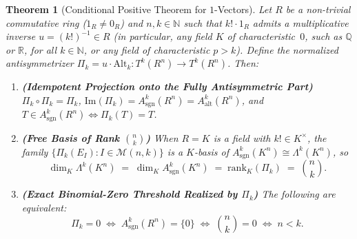 \documentclass[11pt,a4paper]{article}
\newtheorem{theorem}{Theorem}[section]
\theoremstyle{definition}
\theoremstyle{remark}
\newcommand{\Alt}{\mathrm{Alt}}
\newcommand{\sgn}{\mathrm{sgn}}
\newcommand{\im}{\mathrm{Im}}
\newcommand{\Q}{\mathbb{Q}}
\newcommand{\R}{\mathbb{R}}
\newcommand{\N}{\mathbb{N}}
\begin{document}
\begin{theorem}[Conditional Positive Theorem for $1$-Vectors]\label{thm:positive-master}
Let $R$ be a non-trivial commutative ring ($1_R \neq 0_R$) and $n, k \in \N$ such that $k! \cdot 1_R$ admits a multiplicative inverse $u = (k!)^{-1} \in R$ (in particular, any field $K$ of characteristic~$0$, such as $\Q$ or $\R$, for all $k \in \N$, or any field of characteristic $p > k$). Define the normalized antisymmetrizer $\Pi_k = u \cdot \Alt_k : T^k(R^n) \to T^k(R^n)$. Then:
\begin{enumerate}
\item[(a)] \textbf{(Idempotent Projection onto the Fully Antisymmetric Part)} $\Pi_k \circ \Pi_k = \Pi_k$, $\im(\Pi_k) = A^k_{\sgn}(R^n) = A^k_{\mathrm{alt}}(R^n)$, and $T \in A^k_{\sgn}(R^n) \iff \Pi_k(T) = T$.
\item[(b)] \textbf{(Free Basis of Rank $\binom{n}{k}$)} When $R = K$ is a field with $k! \in K^\times$, the family $\{\Pi_k(E_I) : I \in \mathcal{M}(n, k)\}$ is a $K$-basis of $A^k_{\sgn}(K^n) \cong \Lambda^k(K^n)$, so
\[
  \dim_K \Lambda^k(K^n) \;=\; \dim_K A^k_{\sgn}(K^n) \;=\; \mathrm{rank}_K(\Pi_k) \;=\; \binom{n}{k}.
\]
\item[(c)] \textbf{(Exact Binomial-Zero Threshold Realized by $\Pi_k$)} The following are equivalent:
\[
  \Pi_k = 0 \;\iff\; A^k_{\sgn}(R^n) = \{0\} \;\iff\; \binom{n}{k} = 0 \;\iff\; n < k.
\]
\end{enumerate}
\end{theorem}
\end{document}
